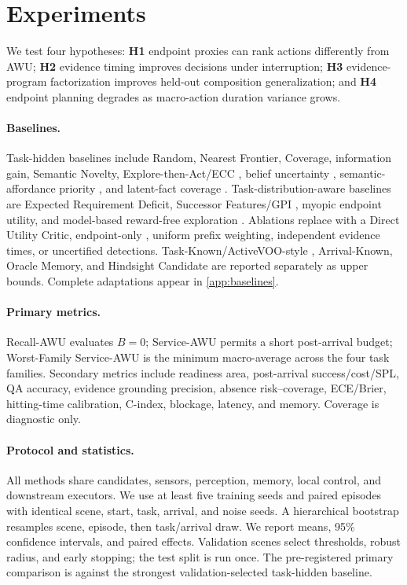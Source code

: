 \section{Experiments}
\label{sec:experiments}

We test four hypotheses:
\textbf{H1} endpoint proxies can rank actions differently from AWU;
\textbf{H2} evidence timing improves decisions under interruption;
\textbf{H3} evidence-program factorization improves held-out composition generalization; and
\textbf{H4} endpoint planning degrades as macro-action duration variance grows.

\paragraph{Baselines.}
Task-hidden baselines include Random, Nearest Frontier, Coverage, information gain, Semantic Novelty, Explore-then-Act/ECC
\citep{ye2026look}, belief uncertainty
\citep{zhang2026theory}, semantic-affordance priority
\citep{chen2026abot}, and latent-fact coverage
\citep{cai2026autocontext}.
Task-distribution-aware baselines are Expected Requirement Deficit, Successor Features/GPI
\citep{barreto2017successor}, myopic endpoint utility, and model-based reward-free exploration
\citep{sekar2020plan2explore,zhang2021rewardfree}.
Ablations replace \method{} with a Direct Utility Critic, endpoint-only \jet{}, uniform prefix weighting, independent evidence times, or uncertified detections.
Task-Known/ActiveVOO-style
\citep{liu2025activevoo}, Arrival-Known, Oracle Memory, and Hindsight Candidate are reported separately as upper bounds.
Complete adaptations appear in \cref{app:baselines}.

\paragraph{Primary metrics.}
Recall-AWU evaluates $B=0$; Service-AWU permits a short post-arrival budget; Worst-Family Service-AWU is the minimum macro-average across the four task families.
Secondary metrics include readiness area, post-arrival success/cost/SPL, QA accuracy, evidence grounding precision, absence risk--coverage, ECE/Brier, hitting-time calibration, C-index, blockage, latency, and memory.
Coverage is diagnostic only.

\paragraph{Protocol and statistics.}
All methods share candidates, sensors, perception, memory, local control, and downstream executors.
We use at least five training seeds and paired episodes with identical scene, start, task, arrival, and noise seeds.
A hierarchical bootstrap resamples scene, episode, then task/arrival draw.
We report means, 95\% confidence intervals, and paired effects.
Validation scenes select thresholds, robust radius, and early stopping; the test split is run once.
The pre-registered primary comparison is \method{} against the strongest validation-selected task-hidden baseline.

